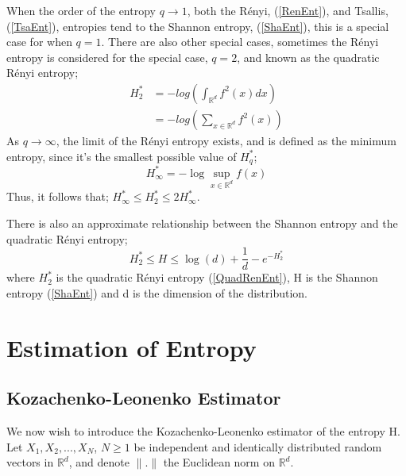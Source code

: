 \documentclass{article}
\begin{document}
When the order of the entropy $q \to 1$, both the R\'enyi, (\ref{RenEnt}), and Tsallis, (\ref{TsaEnt}), entropies tend to the Shannon entropy, (\ref{ShaEnt}), this is a special case for when $q=1$. There are also other special cases, sometimes the R\'enyi entropy is considered for the special case, $q=2$, and known as the quadratic R\'enyi entropy;
\begin{align} 
H_{2}^{*} &= - log\left( \int_{\mathbb{R}^{d}} f^2(x) dx \right) \label{QuadRenEnt} \\
&= - log \left( \sum_{x \in \mathbb{R}^d} f^2 (x) \right) \nonumber 
\end{align}
As $q \to \infty$, the limit of the R\'enyi entropy exists, and is defined as the minimum entropy, since it's the smallest possible value of $H_{q}^{*}$;
\begin{equation}
H_{\infty}^{*} = - \log \sup_{x \in \mathbb{R}^d} f (x) \nonumber
\end{equation}
Thus, it follows that; $H_{\infty}^{*} \leq H_{2}^{*} \leq 2H_{\infty}^{*}$.

There is also an approximate relationship between the Shannon entropy and the quadratic R\'enyi entropy;
\begin{equation}
H_{2}^{*} \leq H \leq \log(d) + \frac{1}{d} - e^{-H_{2}^{*}} \nonumber
\end{equation}
where $H_{2}^{*}$ is the quadratic R\'enyi entropy (\ref{QuadRenEnt}), H is the Shannon entropy (\ref{ShaEnt}) and d is the dimension of the distribution.

\section{Estimation of Entropy}

\subsection{Kozachenko-Leonenko Estimator}

We now wish to introduce the Kozachenko-Leonenko estimator of the entropy H. Let $X_{1}, X_{2}, ... ,X_{N}$, $N \geq 1$ be independent and identically distributed random vectors in $\mathbb{R}^{d}$, and denote $\|.\|$ the Euclidean norm on $\mathbb{R}^{d}$.
 
\end{document}

